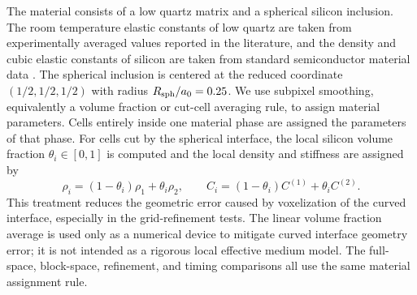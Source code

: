 \documentclass[11pt,oneside]{article}
\numberwithin{equation}{section}
\theoremstyle{plain}
\theoremstyle{remark}
\begin{document}
The material consists of a low quartz matrix and a spherical silicon inclusion. The room temperature elastic constants of low quartz are taken from experimentally averaged values reported in the literature, and the density and cubic elastic constants of silicon are taken from standard semiconductor material data \cite{PabstGregorova2013,IOFFESilicon}. The spherical inclusion is centered at the reduced coordinate \((1/2,1/2,1/2)\) with radius \(R_{\rm sph}/a_0=0.25\). We use subpixel smoothing, equivalently a volume fraction or cut-cell averaging rule, to assign material parameters. Cells entirely inside one material phase are assigned the parameters of that phase. For cells cut by the spherical interface, the local silicon volume fraction \(\theta_i\in[0,1]\) is computed and the local density and stiffness are assigned by
\begin{equation}
\label{eq:subpixel_material_average}
\rho_i=(1-\theta_i)\rho_1+\theta_i\rho_2,
\qquad
C_i=(1-\theta_i)C^{(1)}+\theta_i C^{(2)} .
\end{equation}
This treatment reduces the geometric error caused by voxelization of the curved interface, especially in the grid-refinement tests. The linear volume fraction average is used only as a numerical device to mitigate curved interface geometry error; it is not intended as a rigorous local effective medium model. The full-space, block-space, refinement, and timing comparisons all use the same material assignment rule.
\end{document}
